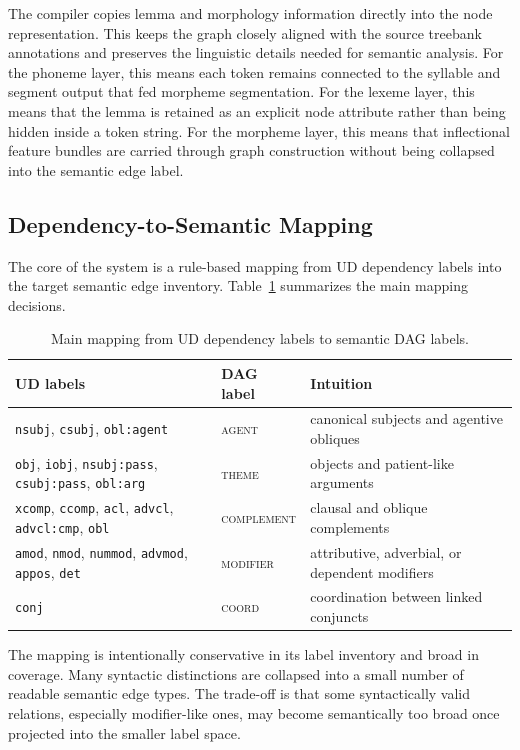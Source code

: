 \documentclass[11pt]{article}
\begin{document}
The compiler copies lemma and morphology information directly into the node
representation. This keeps the graph closely aligned with the source treebank
annotations and preserves the linguistic details needed for semantic analysis.
For the phoneme layer, this means each token remains connected to the syllable
and segment output that fed morpheme segmentation.
For the lexeme layer, this means that the lemma is retained as an explicit node
attribute rather than being hidden inside a token string. For the morpheme layer,
this means that inflectional feature bundles are carried through graph
construction without being collapsed into the semantic edge label.

\subsection{Dependency-to-Semantic Mapping}
The core of the system is a rule-based mapping from UD dependency labels into
the target semantic edge inventory. Table~\ref{tab:mapping} summarizes the
main mapping decisions.

\begin{table}[t]
\centering
\caption{Main mapping from UD dependency labels to semantic DAG labels.}
\label{tab:mapping}
\begin{tabular}{>{\raggedright\arraybackslash}p{2.0in} >{\raggedright\arraybackslash}p{1.4in} >{\raggedright\arraybackslash}p{2.5in}}
\toprule
UD labels & DAG label & Intuition \\
\midrule
\texttt{nsubj}, \texttt{csubj}, \texttt{obl:agent} & \textsc{agent} & canonical subjects and agentive obliques \\
\texttt{obj}, \texttt{iobj}, \texttt{nsubj:pass}, \texttt{csubj:pass}, \texttt{obl:arg} & \textsc{theme} & objects and patient-like arguments \\
\texttt{xcomp}, \texttt{ccomp}, \texttt{acl}, \texttt{advcl}, \texttt{advcl:cmp}, \texttt{obl} & \textsc{complement} & clausal and oblique complements \\
\texttt{amod}, \texttt{nmod}, \texttt{nummod}, \texttt{advmod}, \texttt{appos}, \texttt{det} & \textsc{modifier} & attributive, adverbial, or dependent modifiers \\
\texttt{conj} & \textsc{coord} & coordination between linked conjuncts \\
\bottomrule
\end{tabular}
\end{table}

The mapping is intentionally conservative in its label inventory and broad in
coverage. Many syntactic distinctions are collapsed into a small number of
readable semantic edge types. The trade-off is that some syntactically valid
relations, especially modifier-like ones, may become semantically too broad once
projected into the smaller label space.
\end{document}
